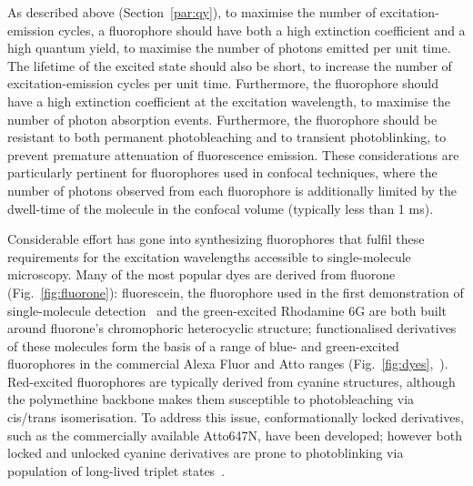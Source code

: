 As described above (Section~\ref{par:qy}), to maximise the number of excitation-emission cycles, a fluorophore should have both a high extinction coefficient and a high quantum yield, to maximise the number of photons emitted per unit time. The lifetime of the excited state should also be short, to increase the number of excitation-emission cycles per unit time. Furthermore, the fluorophore should have a high extinction coefficient at the excitation wavelength, to maximise the number of photon absorption events. Furthermore, the fluorophore should be resistant to both permanent photobleaching and to transient photoblinking, to prevent premature attenuation of fluorescence emission. These considerations are particularly pertinent for fluorophores used in confocal techniques, where the number of photons observed from each fluorophore is additionally limited by the dwell-time of the molecule in the confocal volume (typically less than 1 ms).

Considerable effort has gone into synthesizing fluorophores that fulfil these requirements for the excitation wavelengths accessible to single-molecule microscopy. Many of the most popular dyes are derived from fluorone (Fig.~\ref{fig:fluorone}): fluorescein, the fluorophore used in the first demonstration of single-molecule detection~\cite{Sun1997} and the green-excited Rhodamine 6G are both built around fluorone's chromophoric heterocyclic structure; functionalised derivatives of these molecules form the basis of a range of blue- and green-excited fluorophores in the commercial Alexa Fluor and Atto ranges (Fig.~\ref{fig:dyes},~\cite{Ranasinghe2011}). Red-excited fluorophores are typically derived from cyanine structures, although the polymethine backbone makes them susceptible to photobleaching via cis/trans isomerisation. To address this issue, conformationally locked derivatives, such as the commercially available Atto647N, have been developed; however both locked and unlocked cyanine derivatives are prone to photoblinking via population of long-lived triplet states~\cite{zondervan03}.


